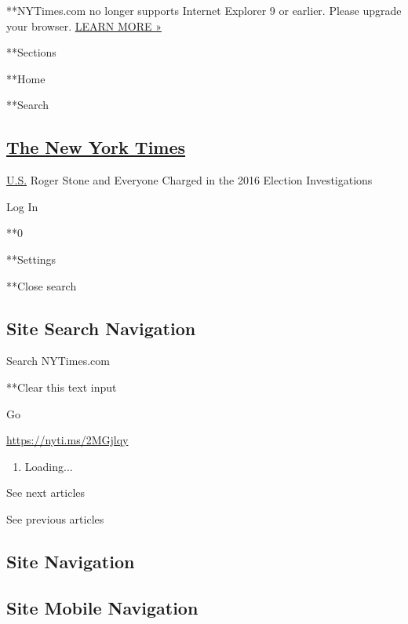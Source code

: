  **NYTimes.com no longer supports Internet Explorer 9 or earlier. Please
upgrade your browser.
\href{http://www.nytimes3xbfgragh.onion/content/help/site/ie9-support.html}{LEARN
MORE »}

**Sections

**Home

**Search

\hypertarget{the-new-york-times}{%
\subsection{\texorpdfstring{\href{http://www.nytimes3xbfgragh.onion/}{The
New York Times}}{The New York Times}}\label{the-new-york-times}}

 \href{https://www.nytimes3xbfgragh.onion/section/us}{U.S.}
\textbar{}Roger Stone and Everyone Charged in the 2016 Election
Investigations

Log In

**0

**Settings

**Close search

\hypertarget{site-search-navigation}{%
\subsection{Site Search Navigation}\label{site-search-navigation}}

Search NYTimes.com

**Clear this text input

Go

\url{https://nyti.ms/2MGjlqy}

\begin{enumerate}
\def\labelenumi{\arabic{enumi}.}
\item
  Loading...
\end{enumerate}

See next articles

See previous articles

\hypertarget{site-navigation}{%
\subsection{Site Navigation}\label{site-navigation}}

\hypertarget{site-mobile-navigation}{%
\subsection{Site Mobile Navigation}\label{site-mobile-navigation}}

